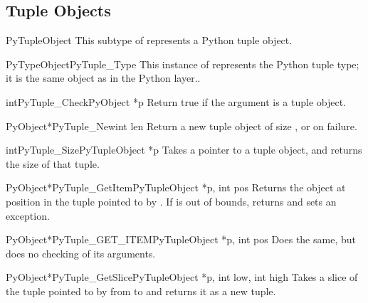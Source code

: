 \documentclass{manual}
\begin{document}
\subsection{Tuple Objects \label{tupleObjects}}

\begin{ctypedesc}{PyTupleObject}
This subtype of  represents a Python tuple object.
\end{ctypedesc}

\begin{cvardesc}{PyTypeObject}{PyTuple_Type}
This instance of  represents the Python tuple
type; it is the same object as  in the Python
layer..
\end{cvardesc}

\begin{cfuncdesc}{int}{PyTuple_Check}{PyObject *p}
Return true if the argument is a tuple object.
\end{cfuncdesc}

\begin{cfuncdesc}{PyObject*}{PyTuple_New}{int len}
Return a new tuple object of size , or \NULL{} on failure.
\end{cfuncdesc}

\begin{cfuncdesc}{int}{PyTuple_Size}{PyTupleObject *p}
Takes a pointer to a tuple object, and returns the size
of that tuple.
\end{cfuncdesc}

\begin{cfuncdesc}{PyObject*}{PyTuple_GetItem}{PyTupleObject *p, int pos}
Returns the object at position  in the tuple pointed
to by .  If  is out of bounds, returns \NULL{} and
sets an  exception.
\end{cfuncdesc}

\begin{cfuncdesc}{PyObject*}{PyTuple_GET_ITEM}{PyTupleObject *p, int pos}
Does the same, but does no checking of its arguments.
\end{cfuncdesc}

\begin{cfuncdesc}{PyObject*}{PyTuple_GetSlice}{PyTupleObject *p,
            int low,
            int high}
Takes a slice of the tuple pointed to by  from
 to  and returns it as a new tuple.
\end{cfuncdesc}
\end{document}
